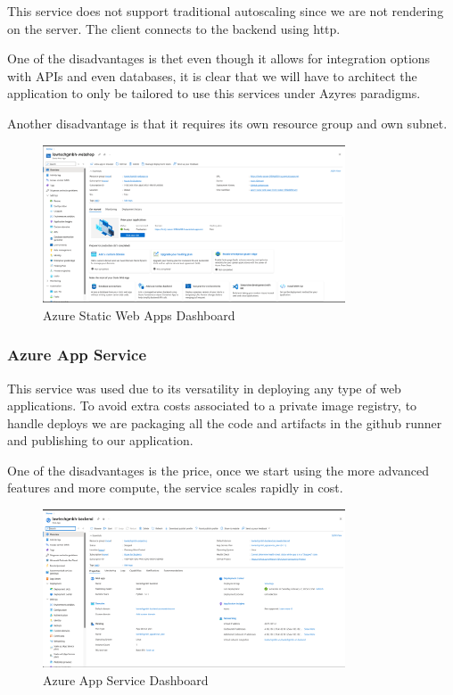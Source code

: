 \documentclass{llncs}
\begin{document}
This service does not support traditional autoscaling since we are not rendering on the server. The client connects to the backend using http.

One of the disadvantages is thet even though it allows for integration options with APIs and even databases, it is clear that we will have to architect the application to only be tailored to use this services under Azyres paradigms.

Another disadvantage is that it requires its own resource group and own subnet.\\
\begin{figure}[htbp]
    \centering
    \includegraphics[width=0.8\textwidth]{../images/frontend_azure.png}
    \vspace{0.01\textwidth}
    \caption{Azure Static Web Apps Dashboard}
    \label{fig:frontend_azure}
\end{figure}


\subsubsection{Azure App Service}

This service was used due to its versatility in deploying any type of web applications. To avoid extra costs associated to a private image registry,
to handle deploys we are packaging all the code and artifacts in the github runner and publishing to our application.

One of the disadvantages is the price, once we start using the more advanced features and more compute, the service scales rapidly in cost.\\

\begin{figure}[htbp]
    \centering
    \includegraphics[width=0.8\textwidth]{../images/backend_azure.png}
    \vspace{0.01\textwidth}
    \caption{Azure App Service Dashboard}
    \label{fig:backend_azure}
\end{figure}
\end{document}
